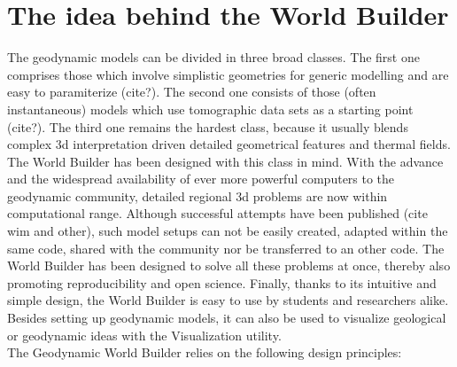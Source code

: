 \documentclass{book}
\newcommand{\GWB}{{Geodynamic World Builder}}
\newcommand{\WB}{{World Builder}}
\begin{document}
\section{The idea behind the World Builder}
\label{section:idea_behind_WB}
The geodynamic models can be divided in three broad classes. The first one comprises those which involve simplistic geometries for generic modelling and are easy to paramiterize (cite?). 
The second one consists of those (often instantaneous) models which use tomographic data sets as a starting point (cite?). 
The third one remains the hardest class, because it usually blends complex 3d interpretation driven detailed geometrical features and thermal fields. The \WB{} has been designed with this class in mind. 
With the advance and the widespread availability of ever more powerful computers to the geodynamic community, detailed regional 3d problems are now within computational range. Although successful attempts have been published (cite wim and other), such model setups can not be easily created, adapted within the same code, shared with the community nor be transferred to an other code. 
The \WB{} has been designed to solve all these problems at once, thereby also promoting reproducibility and open science. 
Finally, thanks to its intuitive and simple design, the \WB{} is easy to use by students and researchers alike. Besides setting up geodynamic models, it can also be used to visualize geological or geodynamic ideas with the Visualization utility. 
\\
The \GWB{} relies on the following design principles:
\\
\end{document}
